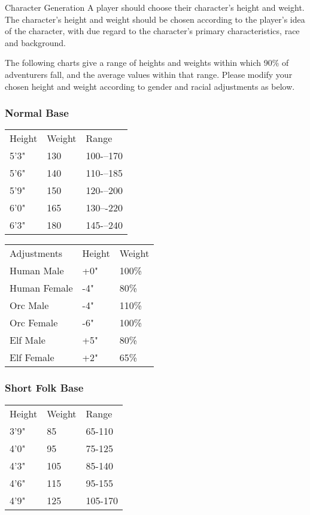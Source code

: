 \begin{Chapter}{Character Generation}
A player should choose their character’s height and weight.  The
character’s height and weight should be chosen according to the
player’s idea of the character, with due regard to the character’s
primary characteristics, race and background.

The following charts give a range of heights and weights within which
90\% of adventurers fall, and the average values within that range.
Please modify your chosen height and weight according to gender and
racial adjustments as below.

\subsubsection{Normal Base}

\begin{tabularx}{\columnwidth}{lll}
Height		& Weight	& Range \\
5’3"		& 130		& 100-–170 \\
5’6"		& 140		& 110-–185 \\
5’9"		& 150		& 120-–200 \\
6’0"		& 165		& 130–-220 \\
6’3"		& 180		& 145-–240 \\
\end{tabularx}

\begin{tabularx}{\columnwidth}{lll}
Adjustments	& Height	& Weight \\
Human Male	& +0"		& 100\% \\
Human Female	& -4"		& 80\% \\
Orc Male	& -4"		& 110\% \\
Orc Female	& -6"		& 100\% \\
Elf Male	& +5"		& 80\% \\
Elf Female	& +2"		& 65\% \\
\end{tabularx}

\subsubsection{Short Folk Base}


\begin{tabularx}{\columnwidth}{lll}
Height		& Weight	& Range \\
3’9"		& 85		& 65-110 \\
4’0"		& 95		& 75-125 \\
4’3"		& 105		& 85-140 \\
4’6"		& 115		& 95-155 \\
4’9"		& 125		& 105-170 \\
\end{tabularx}



\end{Chapter}
